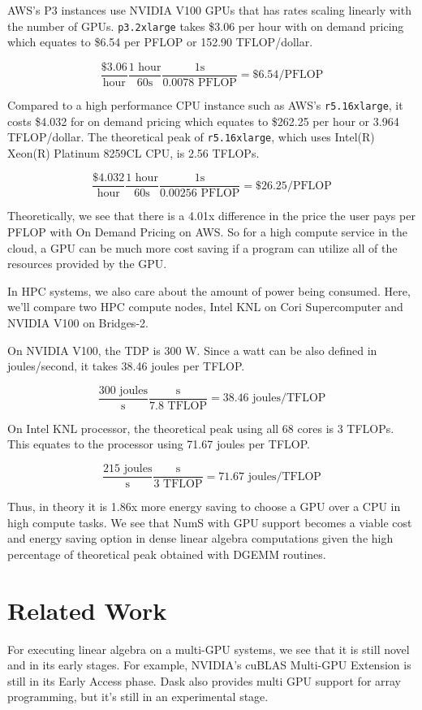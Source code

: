 \documentclass{article}
\begin{document}
AWS's P3 instances use NVIDIA V100 GPUs that has rates scaling linearly with the number of GPUs. \verb|p3.2xlarge| takes \$3.06 per hour with on demand pricing which equates to \$6.54 per PFLOP or 152.90 TFLOP/dollar.

$$\frac{\$3.06}{\textrm{hour}}\frac{1 \textrm{ hour}}{60 \textrm{s}}\frac{1 \textrm{s}}{0.0078\textrm{ PFLOP}} = \$6.54/\textrm{PFLOP}$$


Compared to a high performance CPU instance such as AWS's \verb|r5.16xlarge|, it costs \$4.032 for on demand pricing which equates to \$262.25 per hour or 3.964 TFLOP/dollar. The theoretical peak of \verb|r5.16xlarge|, which uses Intel(R) Xeon(R) Platinum 8259CL CPU, is 2.56 TFLOPs.

$$\frac{\$4.032}{\textrm{hour}}\frac{1 \textrm{ hour}}{60 \textrm{s}}\frac{1 \textrm{s}}{0.00256\textrm{ PFLOP}} = \$26.25/\textrm{PFLOP}$$

Theoretically, we see that there is a 4.01x difference in the price the user pays per PFLOP with On Demand Pricing on AWS. So for a high compute service in the cloud, a GPU can be much more cost saving if a program can utilize all of the resources provided by the GPU.

In HPC systems, we also care about the amount of power being consumed. Here, we'll compare two HPC compute nodes, Intel KNL on Cori Supercomputer and NVIDIA V100 on Bridges-2.

On NVIDIA V100, the TDP is 300 W. Since a watt can be also defined in joules/second, it takes 38.46 joules per TFLOP. \cite{v100}

$$\frac{300\textrm{ joules}}{\textrm{s}}\frac{\textrm{s}}{7.8 \textrm{ TFLOP}} = 38.46 \textrm{ joules/TFLOP}$$


On Intel KNL processor, the theoretical peak using all 68 cores is 3 TFLOPs. This equates to the processor using 71.67 joules per TFLOP. \cite{knl}

$$\frac{215\textrm{ joules}}{\textrm{s}}\frac{\textrm{s}}{3 \textrm{ TFLOP}} = 71.67 \textrm{ joules/TFLOP}$$

Thus, in theory it is 1.86x more energy saving to choose a GPU over a CPU in high compute tasks. We see that NumS with GPU support becomes a viable cost and energy saving option in dense linear algebra computations given the high percentage of theoretical peak obtained with DGEMM routines.

\section{Related Work}
For executing linear algebra on a multi-GPU systems, we see that it is still novel and in its early stages. For example, NVIDIA's cuBLAS Multi-GPU Extension is still in its Early Access phase. \cite{cublasmg} Dask also provides multi GPU support for array programming, but it's still in an experimental stage. \cite{dask-cuda}
\end{document}
